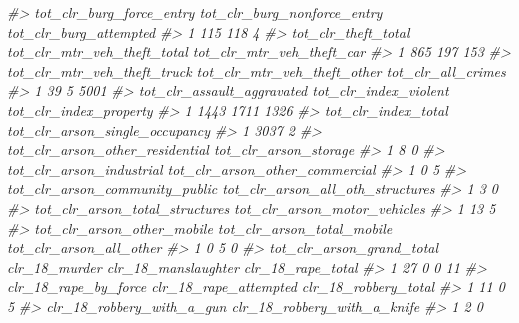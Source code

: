\documentclass[
]{krantz}
\makeatletter
\newenvironment{Shaded}{\begin{snugshade}}{\end{snugshade}}
\newcommand{\CommentTok}[1]{\textcolor[rgb]{0.37,0.37,0.37}{\textit{#1}}}
\newenvironment{kframe}{%
\medskip{}
\setlength{\fboxsep}{.8em}
 \def\at@end@of@kframe{}%
 \ifinner\ifhmode%
  \def\at@end@of@kframe{\end{minipage}}%
  \begin{minipage}{\columnwidth}%
 \fi\fi%
 \def\FrameCommand##1{\hskip\@totalleftmargin \hskip-\fboxsep
 \colorbox{shadecolor}{##1}\hskip-\fboxsep
     \hskip-\linewidth \hskip-\@totalleftmargin \hskip\columnwidth}%
 \MakeFramed {\advance\hsize-\width
   \@totalleftmargin\z@ \linewidth\hsize
   \@setminipage}}%
 {\par\unskip\endMakeFramed%
 \at@end@of@kframe}
\renewenvironment{Shaded}{\begin{kframe}}{\end{kframe}}
\makeatother
\begin{document}
\begin{Shaded}
\begin{Highlighting}[]
\CommentTok{\#\textgreater{}   tot\_clr\_burg\_force\_entry tot\_clr\_burg\_nonforce\_entry tot\_clr\_burg\_attempted}
\CommentTok{\#\textgreater{} 1                      115                         118                      4}
\CommentTok{\#\textgreater{}   tot\_clr\_theft\_total tot\_clr\_mtr\_veh\_theft\_total tot\_clr\_mtr\_veh\_theft\_car}
\CommentTok{\#\textgreater{} 1                 865                         197                       153}
\CommentTok{\#\textgreater{}   tot\_clr\_mtr\_veh\_theft\_truck tot\_clr\_mtr\_veh\_theft\_other tot\_clr\_all\_crimes}
\CommentTok{\#\textgreater{} 1                          39                           5               5001}
\CommentTok{\#\textgreater{}   tot\_clr\_assault\_aggravated tot\_clr\_index\_violent tot\_clr\_index\_property}
\CommentTok{\#\textgreater{} 1                       1443                  1711                   1326}
\CommentTok{\#\textgreater{}   tot\_clr\_index\_total tot\_clr\_arson\_single\_occupancy}
\CommentTok{\#\textgreater{} 1                3037                              2}
\CommentTok{\#\textgreater{}   tot\_clr\_arson\_other\_residential tot\_clr\_arson\_storage}
\CommentTok{\#\textgreater{} 1                               8                     0}
\CommentTok{\#\textgreater{}   tot\_clr\_arson\_industrial tot\_clr\_arson\_other\_commercial}
\CommentTok{\#\textgreater{} 1                        0                              5}
\CommentTok{\#\textgreater{}   tot\_clr\_arson\_community\_public tot\_clr\_arson\_all\_oth\_structures}
\CommentTok{\#\textgreater{} 1                              3                                0}
\CommentTok{\#\textgreater{}   tot\_clr\_arson\_total\_structures tot\_clr\_arson\_motor\_vehicles}
\CommentTok{\#\textgreater{} 1                             13                            5}
\CommentTok{\#\textgreater{}   tot\_clr\_arson\_other\_mobile tot\_clr\_arson\_total\_mobile tot\_clr\_arson\_all\_other}
\CommentTok{\#\textgreater{} 1                          0                          5                       0}
\CommentTok{\#\textgreater{}   tot\_clr\_arson\_grand\_total clr\_18\_murder clr\_18\_manslaughter clr\_18\_rape\_total}
\CommentTok{\#\textgreater{} 1                        27             0                   0                11}
\CommentTok{\#\textgreater{}   clr\_18\_rape\_by\_force clr\_18\_rape\_attempted clr\_18\_robbery\_total}
\CommentTok{\#\textgreater{} 1                   11                     0                    5}
\CommentTok{\#\textgreater{}   clr\_18\_robbery\_with\_a\_gun clr\_18\_robbery\_with\_a\_knife}
\CommentTok{\#\textgreater{} 1                         2                           0}

\end{Highlighting}
\end{Shaded}
\end{document}
